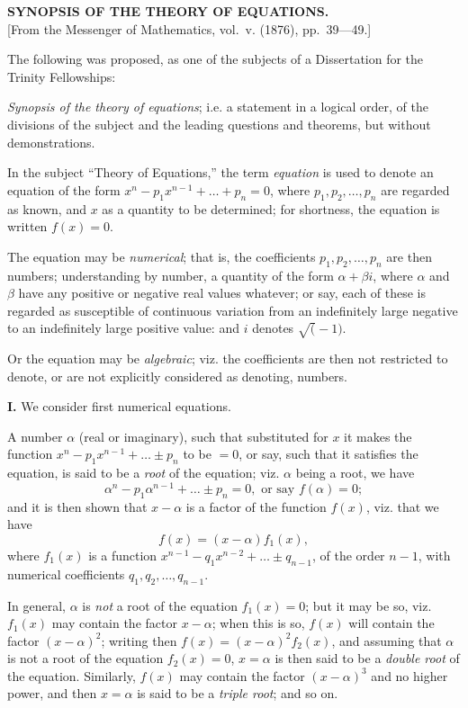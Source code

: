 \documentclass[11pt,a4paper]{book}
\begin{document}
\begin{center}
\textbf{SYNOPSIS OF THE THEORY OF EQUATIONS.}\\[1em]
[From the Messenger of Mathematics, vol.~v. (1876), pp.~39---49.]
\end{center}

The following was proposed, as one of the subjects of a Dissertation for the Trinity Fellowships:

\textit{Synopsis of the theory of equations}; i.e. a statement in a logical order, of the divisions of the subject and the leading questions and theorems, but without demonstrations.

In the subject ``Theory of Equations,'' the term \textit{equation} is used to denote an equation of the form $x^n - p_1 x^{n-1} + \ldots + p_n = 0$, where $p_1, p_2, \ldots, p_n$ are regarded as known, and $x$ as a quantity to be determined; for shortness, the equation is written $f(x) = 0$.

The equation may be \textit{numerical}; that is, the coefficients $p_1, p_2, \ldots, p_n$ are then numbers; understanding by number, a quantity of the form $\alpha + \beta i$, where $\alpha$ and $\beta$ have any positive or negative real values whatever; or say, each of these is regarded as susceptible of continuous variation from an indefinitely large negative to an indefinitely large positive value: and $i$ denotes $\surd(-1)$.

Or the equation may be \textit{algebraic}; viz. the coefficients are then not restricted to denote, or are not explicitly considered as denoting, numbers.

\medskip\noindent\textbf{I.} We consider first numerical equations.

A number $\alpha$ (real or imaginary), such that substituted for $x$ it makes the function $x^n - p_1 x^{n-1} + \ldots \pm p_n$ to be $=0$, or say, such that it satisfies the equation, is said to be a \textit{root} of the equation; viz. $\alpha$ being a root, we have
\[
\alpha^n - p_1 \alpha^{n-1} + \ldots \pm p_n = 0, \text{ or say } f(\alpha) = 0;
\]
and it is then shown that $x - \alpha$ is a factor of the function $f(x)$, viz. that we have
\[
f(x) = (x-\alpha)f_1(x),
\]
where $f_1(x)$ is a function $x^{n-1} - q_1 x^{n-2} + \ldots \pm q_{n-1}$, of the order $n-1$, with numerical coefficients $q_1, q_2, \ldots, q_{n-1}$.

In general, $\alpha$ is \textit{not} a root of the equation $f_1(x) = 0$; but it may be so, viz. $f_1(x)$ may contain the factor $x - \alpha$; when this is so, $f(x)$ will contain the factor $(x-\alpha)^2$; writing then $f(x) = (x-\alpha)^2 f_2(x)$, and assuming that $\alpha$ is not a root of the equation $f_2(x) = 0$, $x = \alpha$ is then said to be a \textit{double root} of the equation. Similarly, $f(x)$ may contain the factor $(x-\alpha)^3$ and no higher power, and then $x = \alpha$ is said to be a \textit{triple root}; and so on.
\end{document}
